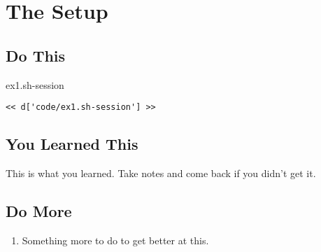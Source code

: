 \chapter{The Setup}

\section{Do This}

\begin{code}{ex1.sh-session}
\begin{Verbatim}
<< d['code/ex1.sh-session'] >>
\end{Verbatim}
\end{code}


\section{You Learned This}

This is what you learned.  Take notes and come back if you didn't get it.

\section{Do More}

\begin{enumerate}
\item Something more to do to get better at this.
\end{enumerate}

